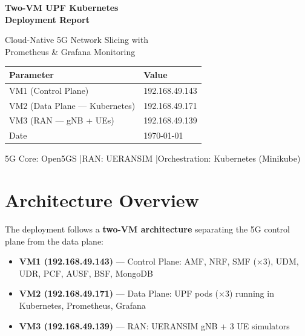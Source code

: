 \documentclass[12pt,a4paper]{article}
\begin{document}
\begin{titlepage}
\centering
\vspace*{3cm}

{\Huge\bfseries\color{darkblue} Two-VM UPF Kubernetes\\[0.3em] Deployment Report}

\vspace{1.5cm}

{\Large Cloud-Native 5G Network Slicing with\\Prometheus \& Grafana Monitoring}

\vspace{2cm}

\begin{tabular}{ll}
\toprule
\textbf{Parameter} & \textbf{Value} \\
\midrule
VM1 (Control Plane) & 192.168.49.143 \\
VM2 (Data Plane — Kubernetes) & 192.168.49.171 \\
VM3 (RAN — gNB + UEs) & 192.168.49.139 \\
Date & \today \\
\bottomrule
\end{tabular}

\vspace{3cm}

{\large 5G Core: Open5GS \quad|\quad RAN: UERANSIM \quad|\quad Orchestration: Kubernetes (Minikube)}

\vfill
\end{titlepage}

\tableofcontents
\newpage

\section{Architecture Overview}

The deployment follows a \textbf{two-VM architecture} separating the 5G control plane from the data plane:

\begin{itemize}[leftmargin=2em]
    \item \textbf{VM1 (192.168.49.143)} — Control Plane: AMF, NRF, SMF (×3), UDM, UDR, PCF, AUSF, BSF, MongoDB
    \item \textbf{VM2 (192.168.49.171)} — Data Plane: UPF pods (×3) running in Kubernetes, Prometheus, Grafana
    \item \textbf{VM3 (192.168.49.139)} — RAN: UERANSIM gNB + 3 UE simulators
\end{itemize}
\end{document}
